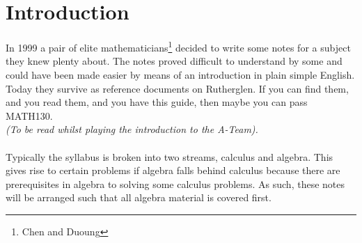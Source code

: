 \section{Introduction}
\label{sec:Introduction}
In 1999 a pair of elite mathematicians\footnote{Chen and Duoung} decided to
write some notes for a subject they knew plenty about. The notes proved
difficult to understand by some and could have been made easier by means of an
introduction in plain simple English. Today they survive as reference documents
on Rutherglen. If you can find them, and you read them, and you have this
guide, then maybe you can pass MATH130.\\
\emph{(To be read whilst playing the introduction to the A-Team).}\\
\\
Typically the syllabus is broken into two streams, calculus and algebra. This
gives rise to certain problems if algebra falls behind calculus because
there are prerequisites in algebra to solving some calculus problems. As such,
these notes will be arranged such that all algebra material is covered first.